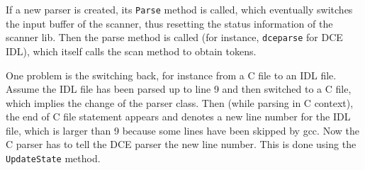 If a new parser is created, its \verb|Parse| method is called, which
eventually switches the input buffer of the scanner, thus resetting the
status information of the scanner lib.  Then the parse method is called
(for instance, \verb|dceparse| for DCE IDL), which itself calls the
scan method to obtain tokens.

One problem is the switching back, for instance from a C file to
an IDL file.  Assume the IDL file has been parsed up to line 9 and
then \dice{} switched to a C file, which implies the change of the
parser class.  Then (while parsing in C context), the end of C
file statement appears and denotes a new line number for the IDL
file, which is larger than 9 because some lines have been skipped by
gcc.  Now the C parser has to tell the DCE parser the new line number.
This is done using the \verb|UpdateState| method.
